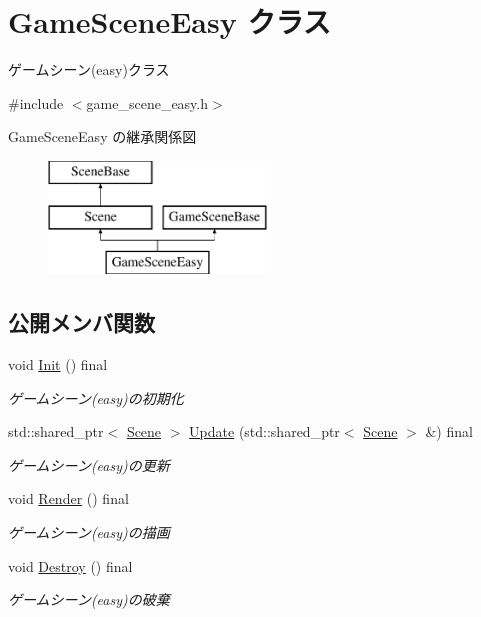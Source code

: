 \hypertarget{class_game_scene_easy}{}\section{Game\+Scene\+Easy クラス}
\label{class_game_scene_easy}


ゲームシーン(easy)クラス  




{\ttfamily \#include $<$game\+\_\+scene\+\_\+easy.\+h$>$}

Game\+Scene\+Easy の継承関係図\begin{figure}[H]
\begin{center}
\leavevmode
\includegraphics[height=3.000000cm]{class_game_scene_easy}
\end{center}
\end{figure}
\subsection*{公開メンバ関数}
\begin{DoxyCompactItemize}
\item 
void \mbox{\hyperlink{class_game_scene_easy_a837e9b0c8227dca2d14f975a8f007ed1}{Init}} () final
\begin{DoxyCompactList}\small\item\em ゲームシーン(easy)の初期化 \end{DoxyCompactList}\item 
std\+::shared\+\_\+ptr$<$ \mbox{\hyperlink{class_scene}{Scene}} $>$ \mbox{\hyperlink{class_game_scene_easy_ac2bccbf61722010fd6f317693ee7b8b1}{Update}} (std\+::shared\+\_\+ptr$<$ \mbox{\hyperlink{class_scene}{Scene}} $>$ \&) final
\begin{DoxyCompactList}\small\item\em ゲームシーン(easy)の更新 \end{DoxyCompactList}\item 
void \mbox{\hyperlink{class_game_scene_easy_ad2cbe509b1f81f0e3b4d1656466dabd3}{Render}} () final
\begin{DoxyCompactList}\small\item\em ゲームシーン(easy)の描画 \end{DoxyCompactList}\item 
void \mbox{\hyperlink{class_game_scene_easy_aadbe3ec3a28639abca94c7868a0a97df}{Destroy}} () final
\begin{DoxyCompactList}\small\item\em ゲームシーン(easy)の破棄 \end{DoxyCompactList}\end{DoxyCompactItemize}


